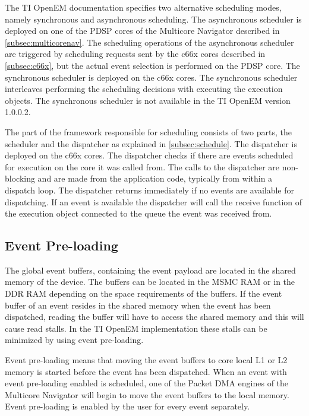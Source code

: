 The TI OpenEM documentation specifies two alternative scheduling modes, namely synchronous and asynchronous scheduling. The asynchronous scheduler is deployed on one of the PDSP cores of the Multicore Navigator described in \ref{subsec:multicorenav}. The scheduling operations of the asynchronous scheduler are triggered by scheduling requests sent by the c66x cores described in \ref{subsec:c66x}, but the actual event selection is performed on the PDSP core. The synchronous scheduler is deployed on the c66x cores. The synchronous scheduler interleaves performing the scheduling decisions with executing the execution objects. The synchronous scheduler is not available in the TI OpenEM version 1.0.0.2.~\cite{moerman2014open}

The part of the framework responsible for scheduling consists of two parts, the scheduler and the dispatcher as explained in \ref{subsec:schedule}. The dispatcher is deployed on the c66x cores. The dispatcher checks if there are events scheduled for execution on the core it was called from. The calls to the dispatcher are non-blocking and are made from the application code, typically from within a dispatch loop. The dispatcher returns immediately if no events are available for dispatching. If an event is available the dispatcher will call the receive function of the execution object connected to the queue the event was received from.~\cite{moerman2014open}

\subsection{Event Pre-loading}
\label{subsec:ti-preloading}
The global event buffers, containing the event payload are located in the shared memory of the device. The buffers can be located in the MSMC RAM or in the DDR RAM depending on the space requirements of the buffers. If the event buffer of an event resides in the shared memory when the event has been dispatched, reading the buffer will have to access the shared memory and this will cause read stalls. In the TI OpenEM implementation these stalls can be minimized by using event pre-loading.~\cite{moerman2014open}

Event pre-loading means that moving the event buffers to core local L1 or L2 memory is started before the event has been dispatched. When an event with event pre-loading enabled is scheduled, one of the Packet DMA engines of the Multicore Navigator will begin to move the event buffers to the local memory. Event pre-loading is enabled by the user for every event separately.~\cite{moerman2014open}

